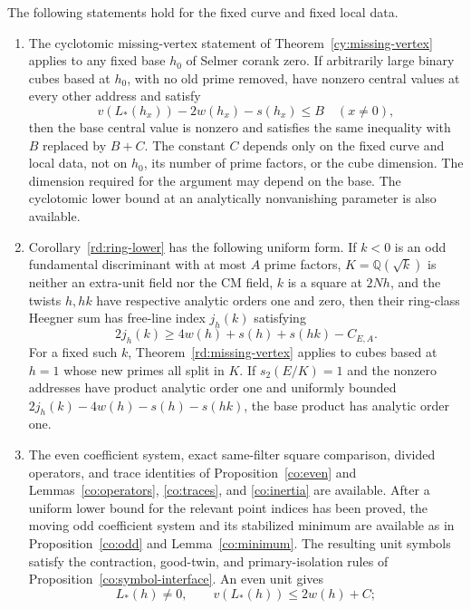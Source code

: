 \begin{proposition}\label{pw:interfaces}
The following statements hold for the fixed curve and fixed local data.
\begin{enumerate}
\item The cyclotomic missing-vertex statement of
Theorem~\ref{cy:missing-vertex} applies to any fixed base $h_0$ of Selmer
corank zero.  If arbitrarily large binary cubes based at $h_0$, with no old
prime removed, have nonzero central values at every other address and satisfy
\[
 v(L_*(h_x))-2w(h_x)-s(h_x)\le B\quad(x\ne0),
\]
then the base central value is nonzero and satisfies the same inequality
with $B$ replaced by $B+C$.  The constant $C$ depends only on the fixed curve
and local data, not on $h_0$, its number of prime factors, or the cube
dimension.  The dimension required for the argument may depend on the base.
The cyclotomic lower bound at an analytically nonvanishing parameter is also
available.
\item Corollary~\ref{rd:ring-lower} has the following uniform form.  If
$k<0$ is an odd fundamental discriminant with at most $A$ prime factors,
$K=\mathbb Q(\sqrt{k})$ is neither an extra-unit field nor the CM field,
$k$ is a square at $2Nh$, and the twists $h,hk$ have respective analytic
orders one and zero, then their ring-class Heegner sum has free-line index
$j_h(k)$ satisfying
\begin{equation}\label{pw:ring-lower-interface}
 2j_h(k)\ge 4w(h)+s(h)+s(hk)-C_{E,A}.
\end{equation}
For a fixed such $k$, Theorem~\ref{rd:missing-vertex} applies to
cubes based at $h=1$ whose new primes all split in $K$.  If
$s_2(E/K)=1$ and the nonzero addresses have product analytic order one and
uniformly bounded
$2j_h(k)-4w(h)-s(h)-s(hk)$, the base product has analytic order one.
\item The even coefficient system, exact same-filter square comparison,
divided operators, and trace identities of
Proposition~\ref{co:even} and Lemmas~\ref{co:operators},
\ref{co:traces}, and \ref{co:inertia} are available.
After a uniform lower bound for the relevant point indices has been proved,
the moving odd coefficient system and its stabilized minimum are available
as in Proposition~\ref{co:odd} and Lemma~\ref{co:minimum}.  The resulting unit symbols
satisfy the contraction, good-twin, and primary-isolation rules of
Proposition~\ref{co:symbol-interface}.  An even unit gives
\begin{equation}\label{pw:even-unit-interface}
 L_*(h)\ne0,\qquad v(L_*(h))\le 2w(h)+C;

\end{equation}
\end{enumerate}
\end{proposition}
